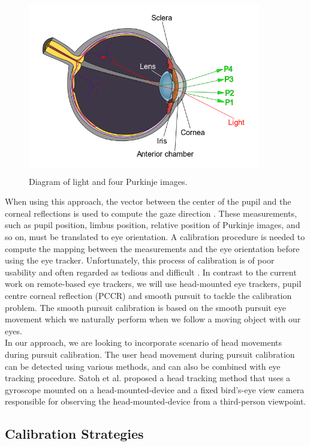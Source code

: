 \begin{figure}[!hbt]
  \centering
  \includegraphics[width=4in,height=3in]{pimage.png}
  \caption{Diagram of light and four Purkinje images.}
  \label{pimage}
\end{figure}


When using this approach, the vector between the center of the pupil and the corneal reflections is used to compute the gaze direction \cite{3}. These measurements, such as pupil position, limbus position, relative position of Purkinje images, and so on, must be translated to eye orientation. A calibration procedure is needed to compute the mapping between the measurements and the eye orientation before using the eye tracker. Unfortunately, this process of calibration is of poor usability and often regarded as tedious and difficult \cite{4}. In contrast to the current work on remote-based eye trackers, we will use head-mounted eye trackers, pupil centre corneal reflection (PCCR) and smooth pursuit to tackle the calibration problem. The smooth pursuit calibration is based on the smooth pursuit eye movement which we naturally perform when we follow a moving object with our eyes.\\

In our approach, we are looking to incorporate scenario of head movements during pursuit calibration. The user head movement during pursuit calibration can be detected using various methods, and can also be combined with eye tracking procedure. Satoh et al. \cite{7} proposed a head tracking method that uses a gyroscope mounted on a head-mounted-device and a fixed bird's-eye view camera responsible for observing the head-mounted-device from a third-person viewpoint.


\subsection{Calibration Strategies}

